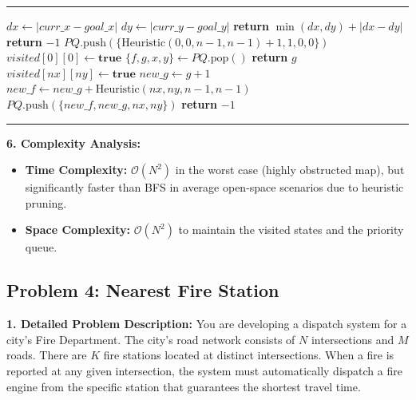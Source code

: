 \vspace{0.5em}
\noindent\rule{\textwidth}{0.6pt}
\begin{algorithmic}[1]
    \State $dx \gets |curr\_x - goal\_x|$
    \State $dy \gets |curr\_y - goal\_y|$
    \State \textbf{return} $\min(dx, dy) + |dx - dy|$
\EndFunction
\Statex
{}
    \State \textbf{return} $-1$
\EndIf
\State $PQ.\text{push}(\{\text{Heuristic}(0,0,n-1,n-1) + 1, 1, 0, 0\})$ 
\State $visited[0][0] \gets \textbf{true}$
\Statex
{}
    \State $\{f, g, x, y\} \gets PQ.\text{pop}()$
        \State \textbf{return} $g$
    \EndIf
            \State $visited[nx][ny] \gets \textbf{true}$
            \State $new\_g \gets g + 1$
            \State $new\_f \gets new\_g + \text{Heuristic}(nx, ny, n-1, n-1)$
            \State $PQ.\text{push}(\{new\_f, new\_g, nx, ny\})$
        \EndIf
    \EndFor
\EndWhile
\State \textbf{return} $-1$
\end{algorithmic}
\vspace{-0.5em}
\noindent\rule{\textwidth}{0.6pt}
\vspace{0.5em}

\textbf{6. Complexity Analysis:}
\begin{itemize}
    \item \textbf{Time Complexity:} $\mathcal{O}(N^2)$ in the worst case (highly obstructed map), but significantly faster than BFS in average open-space scenarios due to heuristic pruning.
    \item \textbf{Space Complexity:} $\mathcal{O}(N^2)$ to maintain the visited states and the priority queue.
\end{itemize}
\subsection{Problem 4: Nearest Fire Station}

\textbf{1. Detailed Problem Description:}
You are developing a dispatch system for a city's Fire Department. The city's road network consists of $N$ intersections and $M$ roads. There are $K$ fire stations located at distinct intersections. When a fire is reported at any given intersection, the system must automatically dispatch a fire engine from the specific station that guarantees the shortest travel time.

